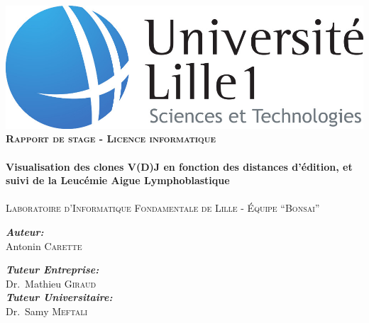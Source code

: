 \begin{titlepage}
\begin{center}

\includegraphics[scale=0.25]{img/logo-lille1.jpg}\\[2cm]


\textsc{\Large \bfseries Rapport de stage - Licence informatique}\\[2cm]

\HRule \\[0.5cm]
{ \Large \bfseries Visualisation des clones V(D)J en fonction des distances d'édition, et suivi de la Leucémie Aigue Lymphoblastique \\[0.5cm]}
\HRule \\[0.5cm]

\textsc{\large Laboratoire d'Informatique Fondamentale de Lille - Équipe ``Bonsai''}\\[2cm]

\begin{minipage}{0.4\textwidth}
\begin{flushleft} \large
\emph{\bfseries Auteur:}\\
Antonin \textsc{Carette}
\end{flushleft}
\end{minipage}
\begin{minipage}{0.4\textwidth}
\begin{flushright} \large
\emph{\bfseries Tuteur Entreprise:} \\
Dr.~Mathieu \textsc{Giraud}\\[0.2cm]
\emph{\bfseries Tuteur Universitaire:} \\
Dr.~Samy \textsc{Meftali}
\end{flushright}
\end{minipage}

\vfill


\end{center}
\end{titlepage}
